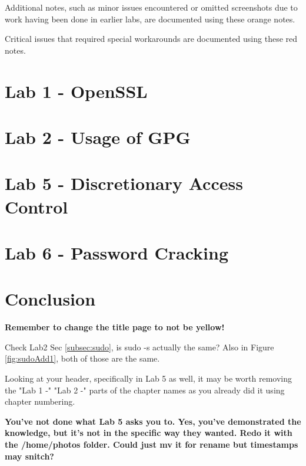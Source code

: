 \documentclass[12pt]{report}
\begin{document}
    \begin{tcolorbox}[colback=orange!5!white,colframe=orange!75!black,title=Example note]
        Additional notes, such as minor issues encountered or omitted screenshots due to
        work having been done in earlier labs, are documented using these orange notes.
    \end{tcolorbox}

    \begin{tcolorbox}[colback=red!5!white,colframe=red!75!black,title=Example important note]
        Critical issues that required special workarounds are documented using these red notes.
    \end{tcolorbox}


    \chapter{Lab 1 - OpenSSL}\label{ch:lab1}
    

    \newpage

    \chapter{Lab 2 - Usage of GPG}\label{ch:lab2}
    

    \addtocounter{chapter}{2} %
    \chapter{Lab 5 - Discretionary Access Control}\label{ch:lab5}
    

    \chapter{Lab 6 - Password Cracking}\label{ch:lab6n}
    

    \chapter*{Conclusion}\label{ch:conclusion}

    \large\textbf{Remember to change the title page to not be yellow!}

    Check Lab2 Sec \ref{subsec:sudo}, is sudo -s actually the same?
    Also in Figure \ref{fig:sudoAdd1}, both of those are the same.

    \noindent Looking at your header, specifically in Lab 5 as well, it may be worth
    removing the "Lab 1 -" "Lab 2 -" parts of the chapter names as you already did it
    using chapter numbering.


    \large\textbf{You've not done what Lab 5 asks you to. Yes, you've demonstrated the knowledge,
    but it's not in the specific way they wanted. Redo it with the /home/photos folder. Could just
    mv it for rename but timestamps may snitch?}

    \printbibliography
\end{document}
